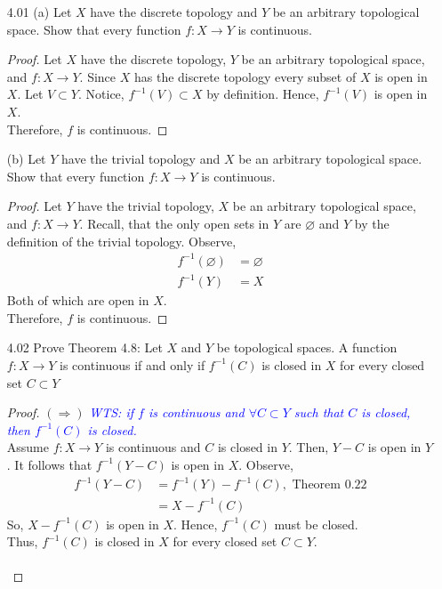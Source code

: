 \documentclass[12pt]{article}
\newcommand{\wts}[1]{\textit{\textcolor{blue}{WTS: #1}}\\}
\newcommand{\1}{^{-1}}
\begin{document}
\begin{enumerate}
	\item[4.01]
	(a) Let $X$ have the discrete topology and $Y$ be an arbitrary topological space. Show that every function $f: X \rightarrow Y$ is continuous.\\
		\begin{proof}
			Let $X$ have the discrete topology, $Y$ be an arbitrary topological space, and $f: X \rightarrow Y$. Since $ X $ has the discrete topology every subset of $ X $ is open in $ X $. Let $ V\subset Y $. Notice, $ f^{-1}(V)\subset X $ by definition. Hence, $ f^{-1}(V) $ is open in $ X $.\\
			Therefore, $ f $ is continuous.
		\end{proof}
	(b) Let $Y$ have the trivial topology and $X$ be an arbitrary topological space. Show that every function $f: X \rightarrow Y$ is continuous.\\
		\begin{proof}
			Let $Y$ have the trivial topology, $X$ be an arbitrary topological space, and $f: X \rightarrow Y$. Recall, that the only open sets in $ Y $ are $ \varnothing $ and $ Y $ by the definition of the trivial topology. Observe,
			\begin{align*}
				f\1(\varnothing)&=\varnothing\\
				f\1(Y)&=X
			\end{align*}
			Both of which are open in $ X $.\\
			Therefore, $ f $ is continuous.
		\end{proof}
	\item[4.02] Prove Theorem 4.8: Let $X$ and $Y$ be topological spaces. A function $f: X \rightarrow Y$ is continuous if and only if $f^{-1}(C)$ is closed in $X$ for every closed set $C \subset Y$
		\begin{proof}
			$ (\Rightarrow)$ \wts{if $ f $ is continuous and $ \forall C\subset Y $ such that $ C $ is closed, then $ f\1(C) $ is closed. }
			Assume $ f:X\to Y $ is continuous and $ C $ is closed in $ Y $. Then, $ Y-C $ is open in $ Y $. It follows that $ f\1(Y-C) $ is open in $ X $. Observe,
			\begin{align*}
				f\1(Y-C) &= f\1(Y)-f\1(C), \text{ Theorem 0.22}\\
						   &= X - f\1(C)
			\end{align*}
			So, $ X-f\1(C) $ is open in $ X $. Hence, $ f\1(C) $ must be closed.\\
			Thus, $ f\1(C) $ is closed in $ X $ for every closed set $ C\subset Y $.\\
		\\

\end{proof}
\end{enumerate}
\end{document}
